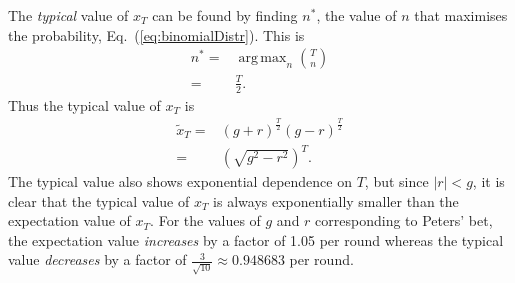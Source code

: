 \documentclass[11pt]{article}
\DeclareMathOperator*{\argmax}{arg\,max}
\begin{document}
\begin{multicols}{2}
The {\em typical} value of $x_T$ can be found by finding $n^*$,  the value of $n$ that maximises the probability, Eq.~(\ref{eq:binomialDistr}). This is
\begin{align*}
n^* =& \argmax_{n} {T \choose n}\\
=& \frac{T}{2}.
\end{align*}
Thus the typical value of $x_T$ is
\begin{align}
\nonumber \widetilde{x}_T =& (g+r)^\frac{T}{2} (g-r)^\frac{T}{2}\\
\label{eq:typicalxT} =& \left( \sqrt{g^2 - r^2}\right)^T.
\end{align}
The typical value also shows exponential dependence on $T$, but since $\left| r\right| < g$, it is clear that the typical value of $x_T$ is always exponentially smaller than the expectation value of $x_T$.
For the values of $g$ and $r$ corresponding to Peters' bet, the expectation value {\em increases} by a factor of 1.05 per round whereas the typical value {\em decreases} by a factor of $\frac{3}{\sqrt{10}} \approx 0.948683$ per round.


\end{multicols}
\end{document}
